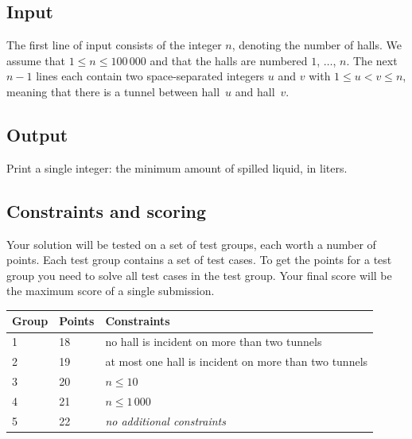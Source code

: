 \subsection*{Input}

The first line of input consists of the integer $n$, denoting the number of halls.
We assume that $1\leq n\leq 100\,000$ and that the halls are numbered $1$, $\ldots$, $n$.
The next $n-1$ lines each contain two space-separated integers $u$ and $v$ with $1\leq u < v \leq n$, meaning that there is a tunnel between hall~$u$ and hall~$v$.

\subsection*{Output}

Print a single integer: the minimum amount of spilled liquid, in liters.

\subsection*{Constraints and scoring}

Your solution will be tested on a set of test groups, each worth a number of points.
Each test group contains a set of test cases.
To get the points for a test group you need to solve all test cases in the test group.
Your final score will be the maximum score of a single submission.

\medskip
\begin{tabular}{lll}
Group & Points & Constraints \\\hline
1 & 18 & no hall is incident on more than two tunnels\\
2 & 19 & at most one hall is incident on more than two tunnels\\
3 & 20 & $n\leq 10$\\
4 & 21 & $n\leq 1\,000$\\
5 & 22 & \emph{no additional constraints}
\end{tabular}
